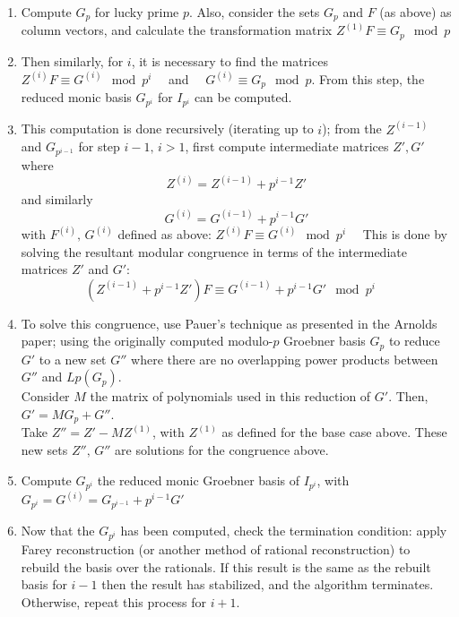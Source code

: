 \documentclass[letterpaper,12pt,titlepage,oneside,final]{book}
\begin{document}
\begin{enumerate}
  \item Compute ${G_p}$ for lucky prime ${p}$.  Also, consider the sets ${G_p}$ and ${F}$ (as above) as column vectors, and calculate the transformation matrix ${Z^{(1)}F \equiv G_p \mod p}$
  \item Then similarly, for ${i}$, it is necessary to find the matrices ${Z^{(i)}F \equiv G^{(i)} \mod p^i \quad}$ and ${\quad G^{(i)} \equiv G_p \mod p}$.  From this step, the reduced monic basis ${G_{p^i}}$ for ${I_{p^i}}$ can be computed.
  \item This computation is done recursively (iterating up to ${i}$); from the ${Z^{(i-1)}}$ and ${G_{p^{i-1}}}$ for step ${i-1,\, i > 1}$, first compute intermediate matrices ${Z', G'}$ where
  \begin{equation*}
    Z^{(i)} = Z^{(i-1)} + p^{i-1}Z'
  \end{equation*}
  and similarly
  \begin{equation*}
    G^{(i)} = G^{(i-1)} + p^{i-1}G'
  \end{equation*}
  with ${F^{(i)},\, G^{(i)}}$ defined as above: ${Z^{(i)}F \equiv G^{(i)} \mod p^i \quad}$
  This is done by solving the resultant modular congruence in terms of the intermediate matrices ${Z'}$ and ${G'}$:
  \begin{equation*}
    (Z^{(i-1)} + p^{i-1}Z')F \equiv G^{(i-1)} + p^{i-1}G'\mod p^i \quad
  \end{equation*}
  \item To solve this congruence, use Pauer's technique as presented in the Arnolds paper; using the originally computed modulo-${p}$ Groebner basis ${G_p}$ to reduce ${G'}$ to a new set ${G''}$ where there are no overlapping power products between ${G''}$ and ${Lp(G_p)}$.  \\ Consider ${M}$ the matrix of polynomials used in this reduction of ${G'}$.  Then, ${G' = MG_p + G''}$.\\ Take ${Z'' = Z' - MZ^{(1)}}$, with ${Z^{(1)}}$ as defined for the base case above.  These new sets ${Z'',\, G''}$ are solutions for the congruence above.
  \item Compute ${G_{p^i}}$ the reduced monic Groebner basis of ${I_{p^i}}$, with ${G_{p^i} = G^{(i)} = G_{p^{i-1}} + p^{i-1}G'}$
  \item Now that the ${G_{p^i}}$ has been computed, check the termination condition: apply Farey reconstruction (or another method of rational reconstruction) to rebuild the basis over the rationals.  If this result is the same as the rebuilt basis for ${i-1}$ then the result has stabilized, and the algorithm terminates.  Otherwise, repeat this process for ${i+1}$.
\end{enumerate}      
\end{document}

